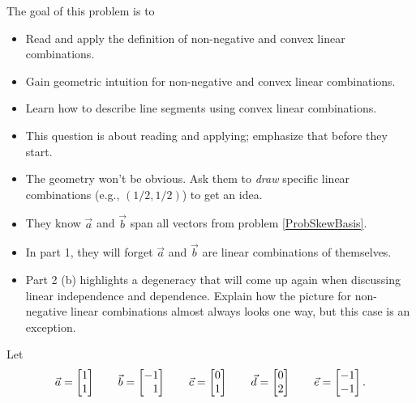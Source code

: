\documentclass{problemset}
\newcommand{\displayonlynewpage}{\begin{displayonly}\newpage\end{displayonly}}
\begin{document}
	\displayonlynewpage

	\question
	\begin{annotation}
		\begin{goals}

			The goal of this problem is to
			\begin{itemize}
				\item Read and apply the definition of non-negative and convex
					linear combinations.
				\item Gain geometric intuition for non-negative and convex linear
					combinations.
				\item Learn how to describe line segments using
					convex linear combinations.
			\end{itemize}
		\end{goals}

		\begin{notes}
			\begin{itemize}
				\item This question is about reading and applying;
					emphasize that before they start.
				\item The geometry won't be obvious. Ask them to \emph{draw} specific
					linear combinations (e.g., $(1/2,1/2)$) to get an idea.
				\item They know $\vec a$ and $\vec b$ span all vectors from problem \ref{ProbSkewBasis}.
				\item In part 1, they will forget $\vec a$ and $\vec b$ are linear combinations of themselves.
				\item Part 2 (b) highlights a degeneracy that will come up again when discussing linear independence
					and dependence. Explain how the picture for non-negative linear combinations
					almost always looks one way, but this case is an exception.
			\end{itemize}
		\end{notes}
	\end{annotation}
	Let
	\[
		\vec a=\mat{1\\1} \qquad \vec b=\mat{-1\\1}\qquad \vec c=\mat{0\\1}\qquad\vec d=\mat{0\\2}\qquad\vec e=\mat{-1\\-1}.
	\]
\end{document}
